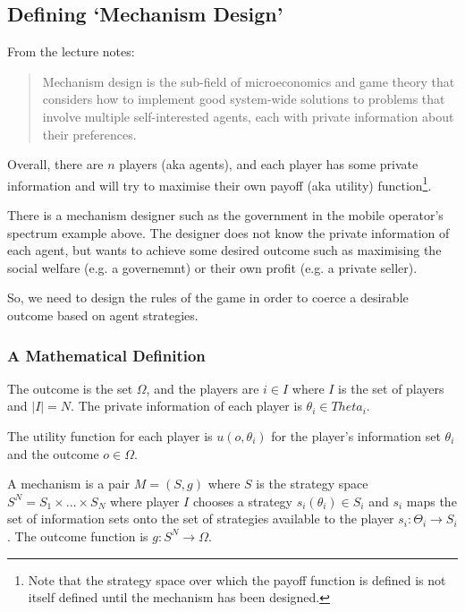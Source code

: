 
\subsection{Defining `Mechanism Design'}

From the lecture notes:

\begin{quote}
  Mechanism design is the sub-field of microeconomics and game theory
  that considers how to implement good system-wide solutions to
  problems that involve multiple self-interested agents, each with
  private information about their preferences.
\end{quote}

Overall, there are $n$ players (aka agents), and each player has some
private information and will try to maximise their own payoff (aka
utility) function\footnote{Note that the strategy space over which the
payoff function is defined is not itself defined until the mechanism
has been designed.}.

There is a mechanism designer such as the government in the mobile
operator's spectrum example above. The designer does not know the
private information of each agent, but wants to achieve some desired
outcome such as maximising the social welfare (e.g. a governemnt) or
their own profit (e.g. a private seller).

So, we need to design the rules of the game in order to coerce a
desirable outcome based on agent strategies.

\subsubsection{A Mathematical Definition}

The outcome is the set $\Omega$, and the players are $i \in I$ where
$I$ is the set of players and $|I| = N$. The private information of
each player is $\theta_i \in Theta_i$.

The utility function for each player is $u(o,\theta_i)$ for the
player's information set $\theta_i$ and the outcome $o \in \Omega$.

A mechanism is a pair $M = (S,g)$ where $S$ is the strategy space $S^N
= S_1 \times \dots \times S_N$ where player $I$ chooses a strategy
$s_i(\theta_i) \in S_i$ and $s_i$ maps the set of information sets
onto the set of strategies available to the player
$s_i: \Theta_i \rightarrow S_i$. The outcome function is $g:
S^N \rightarrow \Omega$.

